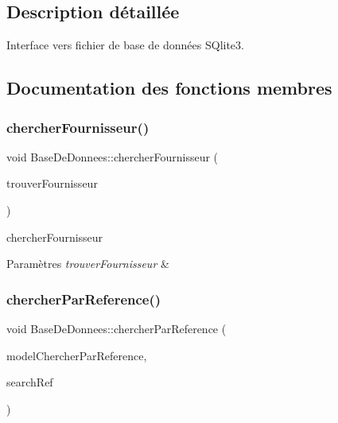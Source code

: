 \subsection{Description détaillée}
Interface vers fichier de base de données S\+Qlite3. 

\subsection{Documentation des fonctions membres}
\mbox{\label{class_base_de_donnees_aaff06392cdd1aa3e3e66f1bb8214d1fb}} 
\subsubsection{\texorpdfstring{chercher\+Fournisseur()}{chercherFournisseur()}}
{\footnotesize\ttfamily void Base\+De\+Donnees\+::chercher\+Fournisseur (\begin{DoxyParamCaption}\item[{Q\+String}]{trouver\+Fournisseur }\end{DoxyParamCaption})}



chercher\+Fournisseur 


\begin{DoxyParams}{Paramètres}
{\em trouver\+Fournisseur} & \\
\hline
\end{DoxyParams}
\mbox{\label{class_base_de_donnees_aaa4a62ca5864ce24cb0b3d488a609811}} 
\subsubsection{\texorpdfstring{chercher\+Par\+Reference()}{chercherParReference()}\hspace{0.1cm}{\footnotesize\ttfamily [1/2]}}
{\footnotesize\ttfamily void Base\+De\+Donnees\+::chercher\+Par\+Reference (\begin{DoxyParamCaption}\item[{Q\+Sql\+Query\+Model $\ast$}]{model\+Chercher\+Par\+Reference,  }\item[{Q\+String}]{search\+Ref }\end{DoxyParamCaption})}



